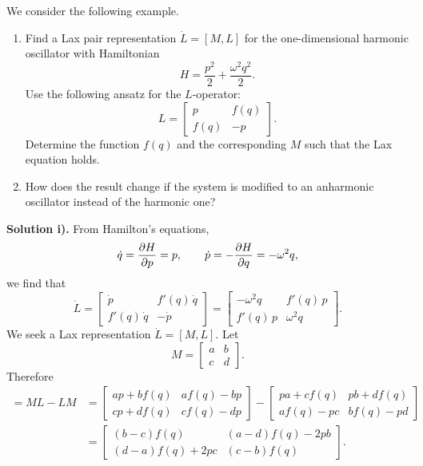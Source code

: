 We consider the following example.
\begin{enumerate} [label=\roman*)]
    \item Find a Lax pair representation $\dot{L} = [M, L]$ for the one-dimensional harmonic oscillator with Hamiltonian
    \begin{equation}
        H = \frac{p^2}{2} + \frac{\omega^2 q^2}{2}.
    \end{equation}
    Use the following ansatz for the $L$-operator:
    \begin{equation}
        L = \begin{bmatrix}
        p & f(q) \\
        f(q) & -p
        \end{bmatrix}.
    \end{equation}
    Determine the function $f(q)$ and the corresponding $M$ such that the Lax equation holds. 
    \item  How does the result change if the system is modified to an anharmonic oscillator instead of the harmonic one?
\end{enumerate}
\textbf{Solution i).}
From Hamilton's equations,
\begin{equation}
    \dot q = \pdv{H}{p} = p, \qquad
    \dot p = - \pdv{H}{q} = -\omega^2 q,
\end{equation}
we find that
\begin{equation}
    \dot L =
    \begin{bmatrix}
    \dot p & f'(q)\,\dot q \\
    f'(q)\, \dot q & -\dot p
    \end{bmatrix}
    =
    \begin{bmatrix}
    -\omega^2 q & f'(q)\,p \\
    f'(q)\,p & \omega^2 q
    \end{bmatrix}.
\end{equation}
We seek a Lax representation $\dot L = [M,L]$.
Let 
\begin{equation}
    M =
    \begin{bmatrix}
        a & b \\
        c & d
    \end{bmatrix}.
\end{equation}
Therefore
\begin{align}
    [M,L] = ML - LM &=
    \begin{bmatrix}
        ap + b f(q) & a f(q) - bp \\
        cp + d f(q) & c f(q) - dp
    \end{bmatrix} 
    - 
    \begin{bmatrix}
        pa + c f(q) & pb + d f(q) \\
        a f(q) - pc & b f(q) - pd
    \end{bmatrix} \\
     &=
    \begin{bmatrix}
        (b - c) f(q) & (a - d) f(q) - 2pb \\
        (d - a) f(q) + 2pc & (c - b) f(q)
    \end{bmatrix}.
\end{align}
